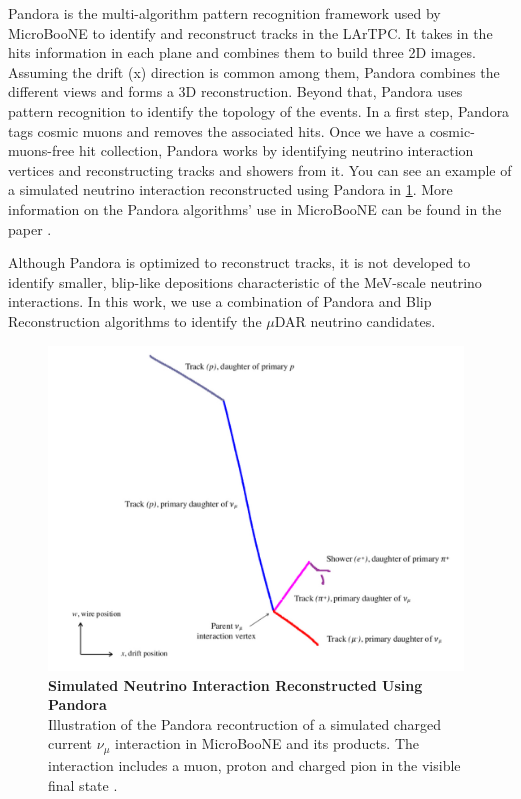 Pandora is the multi-algorithm pattern recognition framework used by MicroBooNE to identify and reconstruct tracks in the LArTPC. It takes in the hits information in each plane and combines them to build three 2D images. Assuming the drift (x) direction is common among them, Pandora combines the different views and forms a 3D reconstruction. Beyond that, Pandora uses pattern recognition to identify the topology of the events. In a first step, Pandora tags cosmic muons and removes the associated hits. Once we have a cosmic-muons-free hit collection, Pandora works by identifying neutrino interaction vertices and reconstructing tracks and showers from it. You can see an example of a simulated neutrino interaction reconstructed using Pandora in \ref{pandora}. More information on the Pandora algorithms' use in MicroBooNE can be found in the paper \cite{pandora}.

Although Pandora is optimized to reconstruct tracks, it is not developed to identify smaller, blip-like depositions characteristic of the MeV-scale neutrino interactions. In this work, we use a combination of Pandora and Blip Reconstruction algorithms to identify the $\mu$DAR neutrino candidates. 

\begin{figure}[h!]
    \centering
    \includegraphics[width=110mm]{Figures/pandora.jpeg}
    \caption[Simulated Neutrino Interaction Reconstructed Using Pandora]{{\textbf{Simulated Neutrino Interaction Reconstructed Using Pandora}}\\ Illustration of the Pandora recontruction of a simulated charged current $\nu_{\mu}$ interaction in MicroBooNE and its products. The interaction includes a muon, proton and charged pion in the visible final state \cite{pandora}.}
    \label{pandora}
\end{figure}

